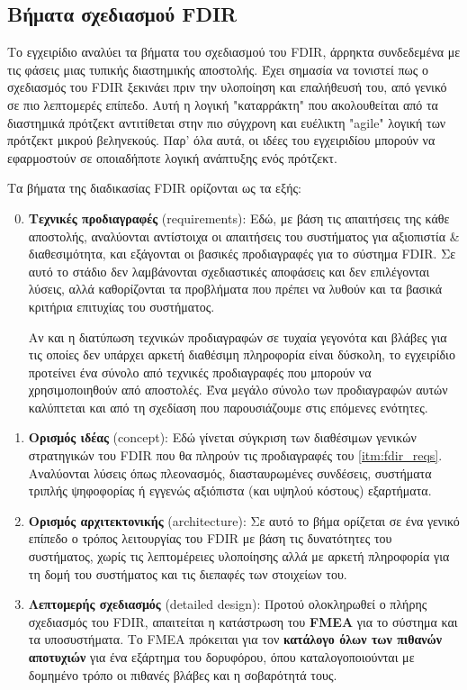 \documentclass[a4paper,nobib]{tufte-book}
\begin{document}
\subsection{Βήματα σχεδιασμού \acs{FDIR}}
Το εγχειρίδιο αναλύει τα βήματα του σχεδιασμού του \acs{FDIR}, άρρηκτα συνδεδεμένα με τις φάσεις μιας τυπικής διαστημικής αποστολής. Έχει σημασία να τονιστεί πως ο σχεδιασμός του \acs{FDIR} ξεκινάει πριν την υλοποίηση και επαλήθευσή του, από γενικό σε πιο λεπτομερές επίπεδο. Αυτή η λογική "καταρράκτη" που ακολουθείται από τα διαστημικά πρότζεκτ αντιτίθεται στην πιο σύγχρονη και ευέλικτη "agile" λογική των πρότζεκτ μικρού βεληνεκούς. Παρ' όλα αυτά, οι ιδέες του εγχειριδίου μπορούν να εφαρμοστούν σε οποιαδήποτε λογική ανάπτυξης ενός πρότζεκτ.

Τα βήματα της διαδικασίας \acs{FDIR} ορίζονται ως τα εξής:
\begin{enumerate}
	\setcounter{enumi}{-1}
	\item \textbf{Τεχνικές προδιαγραφές} (requirements): Εδώ, με βάση τις απαιτήσεις της κάθε αποστολής, αναλύονται αντίστοιχα οι απαιτήσεις του συστήματος για αξιοπιστία \& διαθεσιμότητα, και εξάγονται οι βασικές προδιαγραφές για το σύστημα \acs{FDIR}. Σε αυτό το στάδιο δεν λαμβάνονται σχεδιαστικές αποφάσεις και δεν επιλέγονται λύσεις, αλλά καθορίζονται τα προβλήματα που πρέπει να λυθούν και τα βασικά κριτήρια επιτυχίας του συστήματος.
	\label{itm:fdir_reqs}
	
	Αν και η διατύπωση τεχνικών προδιαγραφών σε τυχαία γεγονότα και βλάβες για τις οποίες δεν υπάρχει αρκετή διαθέσιμη πληροφορία είναι δύσκολη, το εγχειρίδιο προτείνει ένα σύνολο από τεχνικές προδιαγραφές \parencite[42]{SAVOIR-HB-003} που μπορούν να χρησιμοποιηθούν από αποστολές. Ένα μεγάλο σύνολο των προδιαγραφών αυτών καλύπτεται και από τη σχεδίαση που παρουσιάζουμε στις επόμενες ενότητες.
	\item \textbf{Ορισμός ιδέας} (concept): Εδώ γίνεται σύγκριση των διαθέσιμων γενικών στρατηγικών του \acs{FDIR} που θα πληρούν τις προδιαγραφές του \cref{itm:fdir_reqs}. Αναλύονται λύσεις όπως πλεονασμός, διασταυρωμένες συνδέσεις, συστήματα τριπλής ψηφοφορίας ή εγγενώς αξιόπιστα (και υψηλού κόστους) εξαρτήματα.
	\label{itm:fdir_concept}
	\item \textbf{Ορισμός αρχιτεκτονικής} (architecture): Σε αυτό το βήμα ορίζεται σε ένα γενικό επίπεδο ο τρόπος λειτουργίας του \acs{FDIR} με βάση τις δυνατότητες του συστήματος, χωρίς τις λεπτομέρειες υλοποίησης αλλά με αρκετή πληροφορία για τη δομή του συστήματος και τις διεπαφές των στοιχείων του.
	\item \textbf{Λεπτομερής σχεδιασμός} (detailed design): Προτού ολοκληρωθεί ο πλήρης σχεδιασμός του \acs{FDIR}, απαιτείται η κατάστρωση του \textbf{\acf{FMEA}} \autocite{carlson_effective_fmeas_2012} για το σύστημα και τα υποσυστήματα. Το \acs{FMEA} πρόκειται για τον \textbf{κατάλογο όλων των πιθανών αποτυχιών} για ένα εξάρτημα του δορυφόρου, όπου καταλογοποιούνται με δομημένο τρόπο οι πιθανές βλάβες και η σοβαρότητά τους.
	

\end{enumerate}
\end{document}
